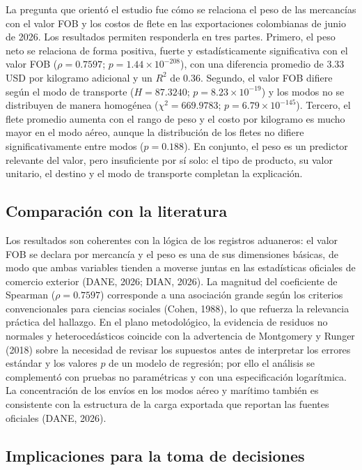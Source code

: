 \documentclass[12pt]{article}
\begin{document}
La pregunta que orientó el estudio fue cómo se relaciona el peso de las
mercancías con el valor FOB y los costos de flete en las exportaciones
colombianas de junio de 2026. Los resultados permiten responderla en
tres partes. Primero, el peso neto se relaciona de forma positiva,
fuerte y estadísticamente significativa con el valor FOB
(\(\rho = 0.7597\); \(p = 1.44 \times 10^{-208}\)), con una diferencia
promedio de 3.33 USD por kilogramo adicional y un \(R^2\) de 0.36.
Segundo, el valor FOB difiere según el modo de transporte
(\(H = 87.3240\); \(p = 8.23 \times 10^{-19}\)) y los modos no se
distribuyen de manera homogénea
(\(\chi^2 = 669.9783\); \(p = 6.79 \times 10^{-145}\)). Tercero, el
flete promedio aumenta con el rango de peso y el costo por kilogramo es
mucho mayor en el modo aéreo, aunque la distribución de los fletes no
difiere significativamente entre modos (\(p = 0.188\)). En conjunto, el
peso es un predictor relevante del valor, pero insuficiente por sí solo:
el tipo de producto, su valor unitario, el destino y el modo de
transporte completan la explicación.

\subsection{Comparación con la literatura}

Los resultados son coherentes con la lógica de los registros aduaneros:
el valor FOB se declara por mercancía y el peso es una de sus
dimensiones básicas, de modo que ambas variables tienden a moverse
juntas en las estadísticas oficiales de comercio exterior
(DANE, 2026; DIAN, 2026). La magnitud del coeficiente de Spearman
(\(\rho = 0.7597\)) corresponde a una asociación grande según los criterios
convencionales para ciencias sociales (Cohen, 1988), lo que refuerza
la relevancia práctica del hallazgo. En el plano metodológico, la
evidencia de residuos no normales y heterocedásticos coincide con la
advertencia de Montgomery y Runger (2018) sobre la necesidad de revisar
los supuestos antes de interpretar los errores estándar y los valores
\(p\) de un modelo de regresión; por ello el análisis se complementó con
pruebas no paramétricas y con una especificación logarítmica. La
concentración de los envíos en los modos aéreo y marítimo también es
consistente con la estructura de la carga exportada que reportan las
fuentes oficiales (DANE, 2026).

\subsection{Implicaciones para la toma de decisiones}
\end{document}
